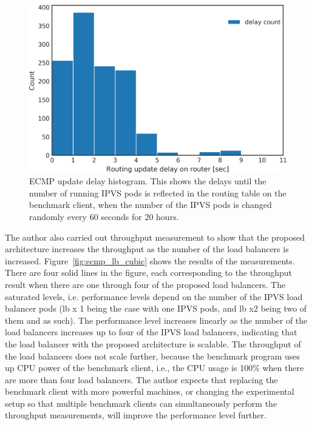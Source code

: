\begin{figure}[h]
  \centering
  \includegraphics[width=0.9\columnwidth]{Figs/ecmp_delay_histgram}
  \par\bigskip
  \centering
  \begin{minipage}{0.9\columnwidth}
    \caption[ECMP update delay histogram]{
      ECMP update delay histogram.
      This shows the delays until the number of running IPVS pods is reflected in the routing table on the benchmark client, when the number of the IPVS pods is changed randomly every 60 seconds for 20 hours.
    }
    \label{fig:ecmp_delay_histgram}
  \end{minipage}
\end{figure}

The author also carried out throughput measurement to show that the proposed architecture increases the throughput as the number of the load balancers is increased.
Figure~\ref{fig:ecmp_lb_cubic} shows the results of the measurements.
There are four solid lines in the figure, each corresponding to the throughput result when there are one through four of the proposed load balancers.
The saturated levels, i.e. performance levels depend on the number of the IPVS load balancer pods (lb x 1 being the case with one IPVS pods, and lb x2 being two of them and as such). 
The performance level increases linearly as the number of the load balancers increases up to four of the IPVS load balancers, indicating that the load balancer with the proposed architecture is scalable.
The throughput of the load balancers  does not scale further, because the benchmark program uses up CPU power of the benchmark client, i.e., the CPU usage is 100\% when there are more than four load balancers.
The author expects that replacing the benchmark client with more powerful machines, or changing the experimental setup so that multiple benchmark clients can simultaneously perform the throughput measurements, will improve the performance level further.

